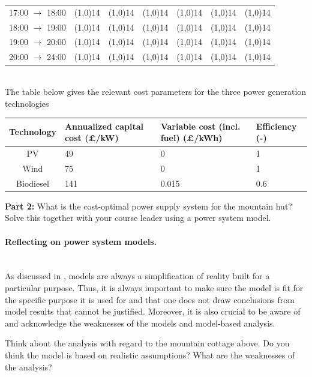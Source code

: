 \begin{kaobox}[frametitle=Task]
\begin{tabular}{ c c c c c c c }
	17:00 $\rightarrow$ 18:00 & \line(1,0){14}& \line(1,0){14} & \line(1,0){14} & \line(1,0){14}& \line(1,0){14} & \line(1,0){14}\\
	18:00 $\rightarrow$ 19:00 & \line(1,0){14}& \line(1,0){14} & \line(1,0){14} & \line(1,0){14}& \line(1,0){14} & \line(1,0){14}\\
	19:00 $\rightarrow$ 20:00 & \line(1,0){14}& \line(1,0){14} & \line(1,0){14} & \line(1,0){14}& \line(1,0){14} & \line(1,0){14}\\
	20:00 $\rightarrow$ 24:00 & \line(1,0){14}& \line(1,0){14} & \line(1,0){14} & \line(1,0){14}& \line(1,0){14} & \line(1,0){14}\\
	\bottomrule
\end{tabular}\\

The table below gives the relevant cost parameters for the three power generation technologies

\begin{tabular}{ c m{2.5cm} m{2.5cm} m{2cm} }
	\toprule
	Technology & Annualized capital cost (\pounds/kW) & Variable cost (incl. fuel) (\pounds /kWh) & Efficiency (-)\\
	\midrule
	PV & 49 & 0 &  1 \\
	Wind & 75 &  0 &  1 \\ 
	Biodiesel & 141 & 0.015 &  0.6 \\
	\bottomrule
\end{tabular}

\textbf{Part 2:} What is the cost-optimal power supply system for the mountain hut? Solve this together with your course leader using a power system model.
\end{kaobox}



\paragraph*{Reflecting on power system models.}~\\


As discussed in , models are always a simplification of reality built for a particular purpose. Thus, it is always important to make sure the model is fit for the specific purpose it is used for and that one does not draw conclusions from model results that cannot be justified. Moreover, it is also crucial to be aware of and acknowledge the weaknesses of the models and model-based analysis.

\begin{kaobox}[frametitle=Task]
Think about the analysis with regard to the mountain cottage above. Do you think the model is based on realistic assumptions? What are the weaknesses of the analysis?
\end{kaobox}



